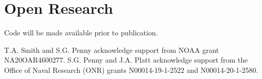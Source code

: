 \documentclass[draft]{agujournal2019}
\begin{document}
%
%








\appendix




\newpage
\section{Open Research}
Code will be made available prior to publication.
%
%


\acknowledgments

T.A. Smith and S.G. Penny acknowledge support from NOAA grant NA20OAR4600277.
S.G. Penny and J.A. Platt acknowledge support from the Office of Naval Research
(ONR) grants N00014-19-1-2522 and N00014-20-1-2580.



%

\end{document}
